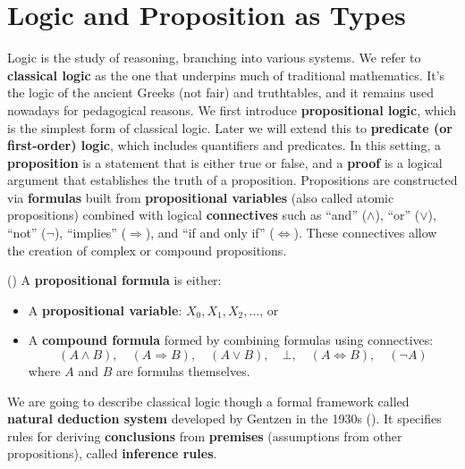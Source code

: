 
\section{Logic and Proposition as Types}

Logic is the study of reasoning, branching into various systems.
We refer to \textbf{classical logic} as the one that underpins much 
of traditional mathematics. 
It's the logic of the ancient Greeks (not fair) and truthtables, and it remains 
used nowadays for pedagogical reasons.
We first introduce \textbf{propositional logic}, which is the simplest 
form of classical logic. 
Later we will extend this to \textbf{predicate (or first-order) logic}, which includes 
quantifiers and predicates.
In this setting, a \textbf{proposition} is a statement that is either true or false, 
and a \textbf{proof} is a logical argument that establishes the truth of a 
proposition.
Propositions are constructed via \textbf{formulas} built from 
\textbf{propositional variables} 
(also called atomic propositions) combined with logical \textbf{connectives} such as ``and'' ($\wedge$), 
``or'' ($\vee$), ``not'' ($\neg$), ``implies'' ($\Rightarrow$), and ``if and only if'' ($\Leftrightarrow$). 
These connectives allow the creation of complex or compound propositions.
\begin{definition}(\cite{thompson1999types})
A \textbf{propositional formula} is either:
\begin{itemize}
    \item A \textbf{propositional variable}: $X_0, X_1, X_2, \ldots$, or
    \item A \textbf{compound formula} formed by combining formulas using connectives:
    \[
        (A \wedge B), \quad (A \Rightarrow B), \quad (A \vee B), \quad \bot, \quad (A \Leftrightarrow B), \quad (\neg A)
    \]
    where $A$ and $B$ are formulas themselves.
\end{itemize}
\end{definition}

We are going to describe classical logic though a formal framework 
called \textbf{natural deduction system}  developed by
Gentzen in the 1930s (\cite{wadler2015propositions}). It specifies 
rules for deriving 
\textbf{conclusions} from \textbf{premises} (assumptions from other propositions), 
called \textbf{inference rules}.

